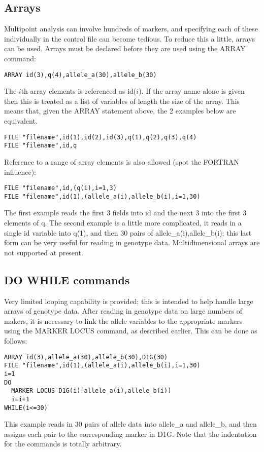 \documentclass[10pt,a4paper]{article}
\begin{document}
\subsection{Arrays}
Multipoint analysis can involve hundreds of markers, and specifying each of
these individually in the control file can become tedious.  To reduce this a
little, arrays can be used.  Arrays must be declared before they are used
using the ARRAY command:
\begin{verbatim}
ARRAY id(3),q(4),allele_a(30),allele_b(30)
\end{verbatim}
The $i$th array elements is referenced as id($i$).  If the array name alone
is given then this is treated as a list of variables of length the size of
the array.  This means that, given the ARRAY statement above, the 2 examples
below are equivalent.
\begin{verbatim}
FILE "filename",id(1),id(2),id(3),q(1),q(2),q(3),q(4)
FILE "filename",id,q
\end{verbatim}
Reference to a range of array elements is also allowed (spot the FORTRAN
influence):
\begin{verbatim}
FILE "filename",id,(q(i),i=1,3)
FILE "filename",id(1),(allele_a(i),allele_b(i),i=1,30)
\end{verbatim}
The first example reads the first 3 fields into id and the next 3 into the
first 3 elements of q.  The second example is a little more complicated, it
reads in a single id variable into q(1), and then 30 pairs of
allele\_a(i),allele\_b(i); this last form can be very useful for reading in
genotype data.  Multidimensional arrays are not supported at present.
\subsection{DO WHILE commands}
Very limited looping capability is provided; this is intended to help handle
large arrays of genotype data.  After reading in genotype data on large
numbers of makers, it is necessary to link the allele variables to the
appropriate markers using the MARKER LOCUS command, as described earlier.
This can be done as follows:
\begin{verbatim}
ARRAY id(3),allele_a(30),allele_b(30),D1G(30)
FILE "filename",id(1),(allele_a(i),allele_b(i),i=1,30)
i=1
DO
  MARKER LOCUS D1G(i)[allele_a(i),allele_b(i)]
  i=i+1
WHILE(i<=30)
\end{verbatim}
This example reads in 30 pairs of allele data into allele\_a and allele\_b,
and then assigns each pair to the corresponding marker in D1G.  Note that
the indentation for the commands is totally arbitrary.
\end{document}
